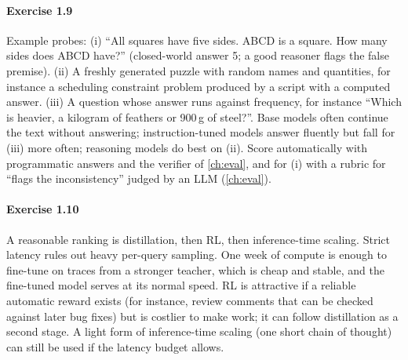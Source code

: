 \paragraph{Exercise 1.9}
Example probes: (i) ``All squares have five sides. ABCD is a square. How many sides does ABCD have?''
(closed-world answer 5; a good reasoner flags the false premise). (ii) A freshly generated puzzle with random
names and quantities, for instance a scheduling constraint problem produced by a script with a computed
answer. (iii) A question whose answer runs against frequency, for instance ``Which is heavier, a kilogram of
feathers or 900\,g of steel?''. Base models often continue the text without answering; instruction-tuned models
answer fluently but fall for (iii) more often; reasoning models do best on (ii). Score automatically with
programmatic answers and the verifier of \cref{ch:eval}, and for (i) with a rubric for ``flags the
inconsistency'' judged by an LLM (\cref{ch:eval}).

\paragraph{Exercise 1.10}
A reasonable ranking is distillation, then RL, then inference-time scaling. Strict latency rules out
heavy per-query sampling. One week of compute is enough to fine-tune on traces from a stronger teacher,
which is cheap and stable, and the fine-tuned model serves at its normal speed. RL is attractive if a
reliable automatic reward exists (for instance, review comments that can be checked against later bug fixes)
but is costlier to make work; it can follow distillation as a second stage. A light form of inference-time
scaling (one short chain of thought) can still be used if the latency budget allows.
